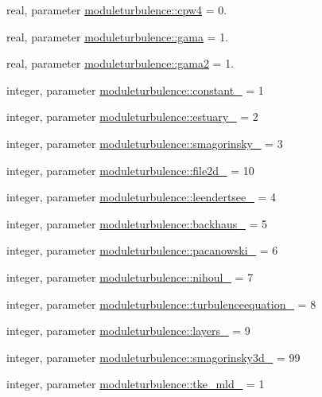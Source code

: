 \begin{DoxyCompactItemize}
real, parameter \mbox{\hyperlink{namespacemoduleturbulence_ae0ec8e0f40d2dde1eb4818c1b1c64440}{moduleturbulence\+::cpw4}} = 0.
\item 
real, parameter \mbox{\hyperlink{namespacemoduleturbulence_a8f01dbc0f39a5dd8da2489f20d7a9533}{moduleturbulence\+::gama}} = 1.
\item 
real, parameter \mbox{\hyperlink{namespacemoduleturbulence_a54890d68b5eb7ba1cdad66eef22b56a6}{moduleturbulence\+::gama2}} = 1.
\item 
integer, parameter \mbox{\hyperlink{namespacemoduleturbulence_a1a6e5da84d7a92e32fbe23db2fd9c51d}{moduleturbulence\+::constant\+\_\+}} = 1
\item 
integer, parameter \mbox{\hyperlink{namespacemoduleturbulence_aa745ad2596a9341093ee58a720d8788b}{moduleturbulence\+::estuary\+\_\+}} = 2
\item 
integer, parameter \mbox{\hyperlink{namespacemoduleturbulence_a29d7fdceea6d5b2feff6d666d0532452}{moduleturbulence\+::smagorinsky\+\_\+}} = 3
\item 
integer, parameter \mbox{\hyperlink{namespacemoduleturbulence_a5b737b397ea4d53ee93ebaa2536042bb}{moduleturbulence\+::file2d\+\_\+}} = 10
\item 
integer, parameter \mbox{\hyperlink{namespacemoduleturbulence_ac18db79bbfe34ce5f8ecc3c5a81e44f2}{moduleturbulence\+::leendertsee\+\_\+}} = 4
\item 
integer, parameter \mbox{\hyperlink{namespacemoduleturbulence_a2e4474631725c7959668fd9dfe8f90d0}{moduleturbulence\+::backhaus\+\_\+}} = 5
\item 
integer, parameter \mbox{\hyperlink{namespacemoduleturbulence_a3919ba926fe406c56c698575129339b3}{moduleturbulence\+::pacanowski\+\_\+}} = 6
\item 
integer, parameter \mbox{\hyperlink{namespacemoduleturbulence_adadd9f612e4d053afcc2457f3e728ce1}{moduleturbulence\+::nihoul\+\_\+}} = 7
\item 
integer, parameter \mbox{\hyperlink{namespacemoduleturbulence_a4458bdc093d13a35fdeaae3b5d7a5de9}{moduleturbulence\+::turbulenceequation\+\_\+}} = 8
\item 
integer, parameter \mbox{\hyperlink{namespacemoduleturbulence_a7eb55bedf9f4cbaeb7e86ac31b2223a2}{moduleturbulence\+::layers\+\_\+}} = 9
\item 
integer, parameter \mbox{\hyperlink{namespacemoduleturbulence_a0c9974d78cad27746ab531d210087c49}{moduleturbulence\+::smagorinsky3d\+\_\+}} = 99
\item 
integer, parameter \mbox{\hyperlink{namespacemoduleturbulence_a6d843198335720f3520b5b04ae013ef0}{moduleturbulence\+::tke\+\_\+mld\+\_\+}} = 1

\end{DoxyCompactItemize}
